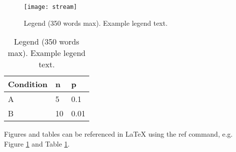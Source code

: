 \documentclass[fleqn,10pt]{wlscirep}
\begin{document}
\begin{figure}[ht]
\centering
\texttt{[image: stream]}
\caption{Legend (350 words max). Example legend text.}
\label{fig:stream}
\end{figure}

\begin{table}[ht]
\centering
\begin{tabular}{|l|l|l|}
\hline
Condition & n & p \\
\hline
A & 5 & 0.1 \\
\hline
B & 10 & 0.01 \\
\hline
\end{tabular}
\caption{\label{tab:example}Legend (350 words max). Example legend text.}
\end{table}

Figures and tables can be referenced in LaTeX using the ref command, e.g. Figure \ref{fig:stream} and Table \ref{tab:example}.
\end{document}
